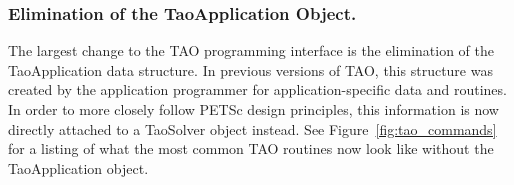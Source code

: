 \subsubsection*{Elimination of the TaoApplication Object.}
The largest change to the TAO programming interface is the elimination of the
TaoApplication data structure. In previous versions of TAO, this structure was 
created by the application programmer for application-specific data and 
routines.  In order to more closely follow PETSc design principles, this 
information is now directly attached to a TaoSolver object instead.  See 
Figure~\ref{fig:tao_commands} for a listing of what the most common TAO 
routines now look like without the TaoApplication object.

